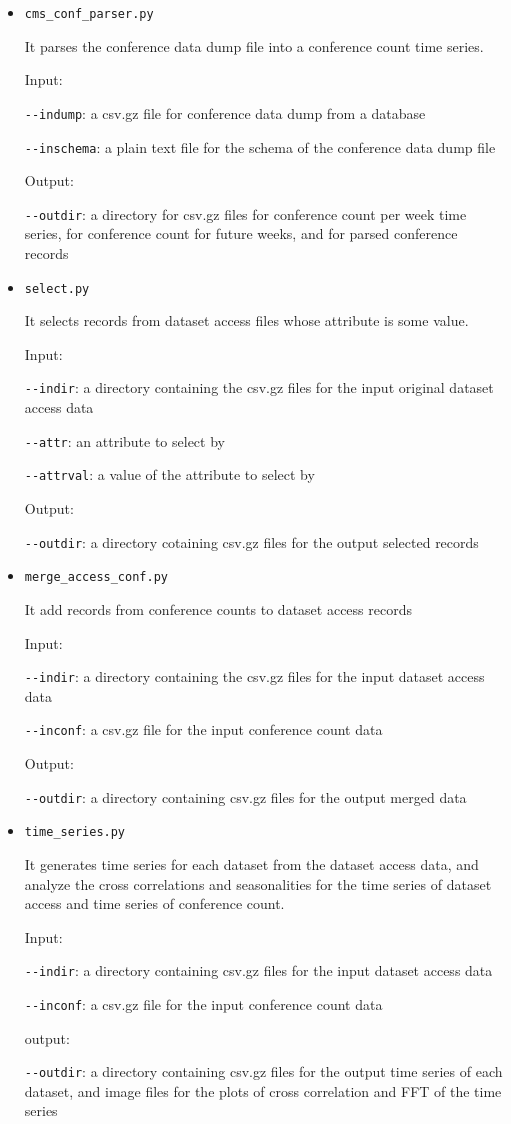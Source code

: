 \documentclass[final, 12pt]{elsarticle}
\begin{document}
\begin{itemize}
\item \verb|cms_conf_parser.py|
  
  It parses the conference data dump file into a conference count time series.

  Input:

  \verb|--indump|: a csv.gz file for conference data dump from a database

  \verb|--inschema|: a plain text file for the schema of the conference data dump file

  Output:

  \verb|--outdir|: a directory for csv.gz files for conference count per week time series, for conference count for future weeks, and for parsed conference records
  
  
\item \verb|select.py|

  It selects records from dataset access files whose attribute is some value.

  Input:
  
  \verb|--indir|: a directory containing the csv.gz files for the input original dataset access data

  \verb|--attr|: an attribute to select by

  \verb|--attrval|: a value of the attribute to select by

  Output:

  \verb|--outdir|: a directory cotaining csv.gz files for the output selected records

\item \verb|merge_access_conf.py|

  It add records from conference counts to dataset access records

  Input:

  \verb|--indir|: a directory containing the csv.gz files for the input dataset access data

  \verb|--inconf|: a csv.gz file for the input conference count data

  Output:

  \verb|--outdir|: a directory containing csv.gz files for the output merged data 

\item \verb|time_series.py|

  It generates time series for each dataset from the dataset access data, and analyze the cross correlations and seasonalities for the time series of dataset access and time series of conference count.

  Input:
  
  \verb|--indir|: a directory containing csv.gz files for the input dataset access data

  \verb|--inconf|: a csv.gz file for the input conference count data

  output:

  \verb|--outdir|: a directory containing csv.gz files for the output time series of each dataset, and image files for the plots of cross correlation and FFT of the time series

\end{itemize}
\end{document}
